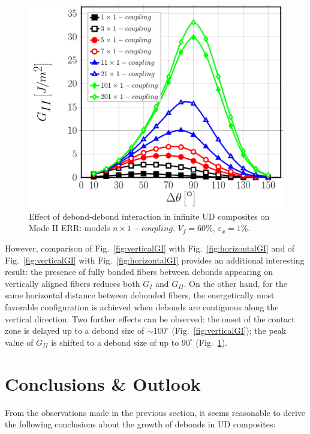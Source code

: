 \documentclass[review]{elsarticle}
\begin{document}
\begin{figure}[!h]
\centering
\includegraphics[width=\textwidth]{nx1-coupling-vf60-GII.pdf}
\caption{Effect of debond-debond interaction in infinite UD composites on Mode II ERR: models $n\times 1-coupling$. $V_{f}=60\%$, $\varepsilon_{x}=1\%$.}\label{fig:verticalGII}
\end{figure}

However, comparison of Fig.~\ref{fig:verticalGI} with Fig.~\ref{fig:horizontalGI} and of Fig.~\ref{fig:verticalGI} with Fig.~\ref{fig:horizontalGI} provides an additional interesting result: the presence of fully bonded fibers between debonds appearing on vertically aligned fibers reduces both $G_{I}$ and $G_{II}$. On the other hand, for the same horizontal distance between debonded fibers, the energetically most favorable configuration is achieved when debonds are contiguous along the vertical direction. Two further effects can be observed: the onset of the contact zone is delayed up to a debond size of $\sim100^{\circ}$ (Fig.~\ref{fig:verticalGI}); the peak value of $G_{II}$ is shifted to a debond size of up to $90^{\circ}$ (Fig.~\ref{fig:verticalGII}).

\section{Conclusions \& Outlook}

From the observations made in the previous section, it seems reasonable to derive the following conclusions about the growth of debonds in UD composites:
\end{document}
